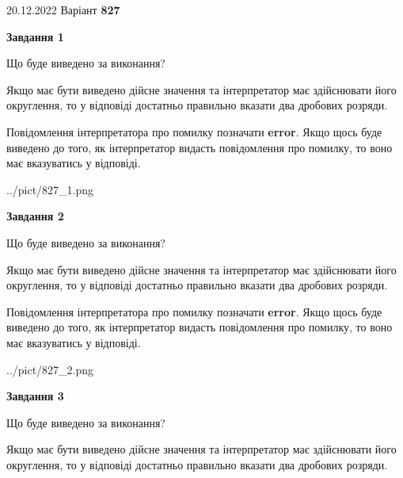 \documentclass[12pt, ukrainian]{article}
\begin{document}
{20.12.2022 Варіант \No \textbf { 827 }\par}
{
\begin {Large}

{\begin {center}\textbf{Завдання 1}\end {center}}\par
Що буде виведено за виконання? \par

Якщо має бути виведено дійсне значення та інтерпретатор має здійснювати його округлення, 
то у відповіді достатньо правильно вказати два дробових розряди.

Повідомлення інтерпретатора про помилку позначати \textbf{error}.
Якщо щось буде виведено до того, як інтерпретатор видасть повідомлення про помилку, 
то воно має вказуватись у відповіді. \par

\begin{center}
	{../pict/827_1.png}
\end{center}
\newpage

{\begin {center}\textbf{Завдання 2}\end {center}}\par
Що буде виведено за виконання? \par

Якщо має бути виведено дійсне значення та інтерпретатор має здійснювати його округлення, 
то у відповіді достатньо правильно вказати два дробових розряди.

Повідомлення інтерпретатора про помилку позначати \textbf{error}.
Якщо щось буде виведено до того, як інтерпретатор видасть повідомлення про помилку, 
то воно має вказуватись у відповіді. \par

\begin{center}
	{../pict/827_2.png}
\end{center}
\newpage

{\begin {center}\textbf{Завдання 3}\end {center}}\par
Що буде виведено за виконання? \par

Якщо має бути виведено дійсне значення та інтерпретатор має здійснювати його округлення, 
то у відповіді достатньо правильно вказати два дробових розряди.


\end{Large}}
\end{document}
